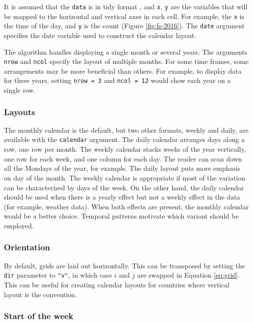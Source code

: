 \documentclass[12pt]{article}
\begin{document}
It is assumed that the \texttt{data} is in tidy format \citep{wickham2014tidy}, and \texttt{x}, \texttt{y} are the variables that will be mapped to the horizontal and vertical axes in each cell. For example, the \texttt{x} is the time of the day, and \texttt{y} is the count (Figure \ref{fig:fs-2016}). The \texttt{date} argument specifies the date variable used to construct the calendar layout.

The algorithm handles displaying a single month or several years. The arguments \texttt{nrow} and \texttt{ncol} specify the layout of multiple months. For some time frames, some arrangements may be more beneficial than others. For example, to display data for three years, setting \texttt{nrow\ =\ 3} and \texttt{ncol\ =\ 12} would show each year on a single row.

\hypertarget{layouts}{%
\subsubsection{Layouts}\label{layouts}}

The monthly calendar is the default, but two other formats, weekly and daily, are available with the \texttt{calendar} argument. The daily calendar arranges days along a row, one row per month. The weekly calendar stacks weeks of the year vertically, one row for each week, and one column for each day. The reader can scan down all the Mondays of the year, for example. The daily layout puts more emphasis on day of the month. The weekly calendar is appropriate if most of the variation can be characterized by days of the week. On the other hand, the daily calendar should be used when there is a yearly effect but not a weekly effect in the data (for example, weather data). When both effects are present, the monthly calendar would be a better choice. Temporal patterns motivate which variant should be employed.

\hypertarget{orientation}{%
\subsubsection{Orientation}\label{orientation}}

By default, grids are laid out horizontally. This can be transposed by setting the \texttt{dir} parameter to \texttt{"v"}, in which case \(i\) and \(j\) are swapped in Equation \eqref{eq:grid}. This can be useful for creating calendar layouts for countries where vertical layout is the convention.

\hypertarget{start-of-the-week}{%
\subsubsection{Start of the week}\label{start-of-the-week}}
\end{document}
